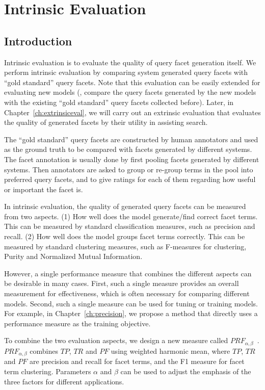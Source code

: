 \chapter{Intrinsic Evaluation} 
\label{ch:intrinsiceval}
\section{Introduction}
Intrinsic evaluation is to evaluate the quality of query facet generation itself. We perform intrinsic evaluation by comparing system generated query facets with ``gold standard'' query facets. Note that this evaluation can be easily extended for evaluating new models (\ie, compare the query facets generated by the new models with the existing ``gold standard'' query facets  collected before). Later, in Chapter~\ref{ch:extrinsiceval}, we will carry out an extrinsic evaluation that evaluates the quality of generated facets by their utility in assisting search.

The ``gold standard'' query facets are constructed by human annotators and used as the ground truth to be compared with facets generated by different systems. The facet annotation is usually done by first pooling facets generated by different systems. Then annotators are asked to group or re-group terms in the pool into preferred query facets, and to give ratings for each of them regarding how useful or important the facet is.


In intrinsic evaluation, the quality of generated query facets can be measured from two aspects. (1) How well does the model generate/find correct facet terms. This can be measured by standard classification measures, such as precision and recall. (2) How well does the model groups facet terms correctly. This can be measured by standard clustering measures, such as F-measures for clustering, Purity and Normalized Mutual Information.

However, a single performance measure that combines the different aspects can be desirable in many cases. First, such a single measure provides an overall measurement for effectiveness, which is often necessary for comparing different models. Second, such a single measure can be used for tuning or training models. For example, in Chapter~\ref{ch:precision}, we propose a method that directly uses a performance measure as the training objective. 

To combine the two evaluation aspects, we design a new measure called $PRF_{\alpha,\beta}$~\cite{kong2013extracting}. $PRF_{\alpha,\beta}$ combines $TP$, $TR$ and $PF$ using weighted harmonic mean, where $TP$, $TR$ and $PF$ are precision and recall for facet terms, and the F1 measure for facet term clustering. Parameters $\alpha$ and $\beta$ can be used to adjust the emphasis of the three factors for different applications.

